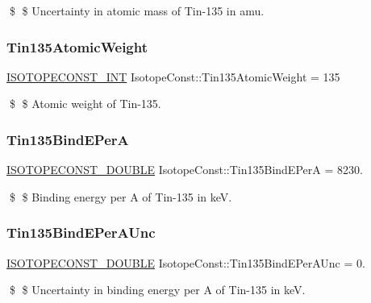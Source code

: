 \$ \$ Uncertainty in atomic mass of Tin-\/135 in amu. \mbox{\label{group___isotope_const-_tin-_sn135_ga724a305cda9f7602a242c066bd501afd}} 
\subsubsection{\texorpdfstring{Tin135\+Atomic\+Weight}{Tin135AtomicWeight}}
{\footnotesize\ttfamily \mbox{\hyperlink{group___isotope_const-_macros_ga5f18360b3e99483a35c32d789e62621c}{I\+S\+O\+T\+O\+P\+E\+C\+O\+N\+S\+T\+\_\+\+I\+NT}} Isotope\+Const\+::\+Tin135\+Atomic\+Weight = 135}

\$ \$ Atomic weight of Tin-\/135. \mbox{\label{group___isotope_const-_tin-_sn135_ga97786641d5f2c59c05d5476e6db009b7}} 
\subsubsection{\texorpdfstring{Tin135\+Bind\+E\+PerA}{Tin135BindEPerA}}
{\footnotesize\ttfamily \mbox{\hyperlink{group___isotope_const-_macros_ga8f45a7272ce02c0b4c65c44636ed719a}{I\+S\+O\+T\+O\+P\+E\+C\+O\+N\+S\+T\+\_\+\+D\+O\+U\+B\+LE}} Isotope\+Const\+::\+Tin135\+Bind\+E\+PerA = 8230.}

\$ \$ Binding energy per A of Tin-\/135 in keV. \mbox{\label{group___isotope_const-_tin-_sn135_ga66aae9a7890b3144393ab49219ad7a1d}} 
\subsubsection{\texorpdfstring{Tin135\+Bind\+E\+Per\+A\+Unc}{Tin135BindEPerAUnc}}
{\footnotesize\ttfamily \mbox{\hyperlink{group___isotope_const-_macros_ga8f45a7272ce02c0b4c65c44636ed719a}{I\+S\+O\+T\+O\+P\+E\+C\+O\+N\+S\+T\+\_\+\+D\+O\+U\+B\+LE}} Isotope\+Const\+::\+Tin135\+Bind\+E\+Per\+A\+Unc = 0.}

\$ \$ Uncertainty in binding energy per A of Tin-\/135 in keV. \mbox{\label{group___isotope_const-_tin-_sn135_gadf76fa057672261f3ad218fead3a0765}} 
